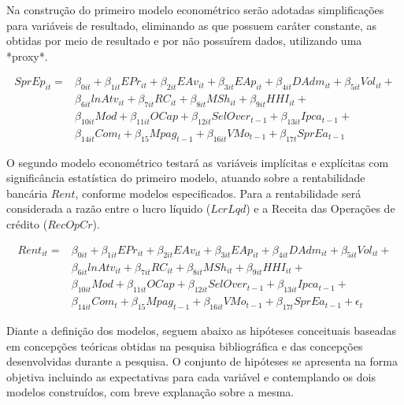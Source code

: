 \documentclass[
  12pt,
  12pt,
  openright,
  oneside,
  a4paper,
  chapter=TITLE,
  section=TITLE,
  subsection=TITLE,
  subsubsection=TITLE,
  english,
  portugues,
  sumario=tradicional]{abntex2}
\begin{document}
\begin{apendicesenv}
Na construção do primeiro modelo econométrico serão adotadas simplificações para variáveis de resultado, eliminando as que possuem caráter constante, as obtidas por meio de resultado e por não possuírem dados, utilizando uma *proxy*.

\begin{equation}
\begin{aligned}
SprEp_{it} = & \beta_{0it} + \beta_{1it}EPr_{it} + \beta_{2it}EAv_{it} + \beta_{3it}EAp_{it} + \beta_{4it}DAdm_{it} + \beta_{5it}Vol_{it} + \\
& \beta_{6it}lnAtv_{it} + \beta_{7it}RC_{it} + \beta_{8it}MSh_{it} + \beta_{9it}HHI_{it} + \\ 
& \beta_{10it}Mod + \beta_{11it}OCap + \beta_{12it}SelOver_{t-1} + \beta_{13it}Ipca_{t-1} + \\
& \beta_{14it}Com_{t} + \beta_{15}Mpag_{t-1} + \beta_{16it}VMo_{t-1} +  \beta_{17t}SprEa_{t-1}
\end{aligned}
\end{equation}

O segundo modelo econométrico testará as variáveis implícitas e explícitas com significância estatística do primeiro modelo, atuando sobre a rentabilidade bancária $Rent$, conforme modelos especificados. Para a rentabilidade será considerada a razão entre o lucro líquido ($LcrLqd$) e a Receita das Operações de crédito ($RecOpCr$).

\begin{equation}
\begin{aligned}
Rent_{it} = & \beta_{0it} + \beta_{1it}EPr_{it} + \beta_{2it}EAv_{it} + \beta_{3it}EAp_{it} + \beta_{4it}DAdm_{it} + \beta_{5it}Vol_{it} + \\
& \beta_{6it}lnAtv_{it} + \beta_{7it}RC_{it} + \beta_{8it}MSh_{it} + \beta_{9it}HHI_{it} + \\ 
& \beta_{10it}Mod + \beta_{11it}OCap + \beta_{12it}SelOver_{t-1} + \beta_{13it}Ipca_{t-1} + \\
& \beta_{14it}Com_{t} + \beta_{15}Mpag_{t-1} + \beta_{16it}VMo_{t-1} +  \beta_{17t}SprEa_{t-1} + \epsilon_{t}
\end{aligned}
\end{equation}

Diante a definição dos modelos, seguem abaixo as hipóteses conceituais baseadas em concepções teóricas obtidas na pesquisa bibliográfica e das concepções desenvolvidas durante a pesquisa. O conjunto de hipóteses se apresenta na forma objetiva incluindo as expectativas para cada variável e contemplando os dois modelos construídos, com breve explanação sobre a mesma.



\end{apendicesenv}
\end{document}
